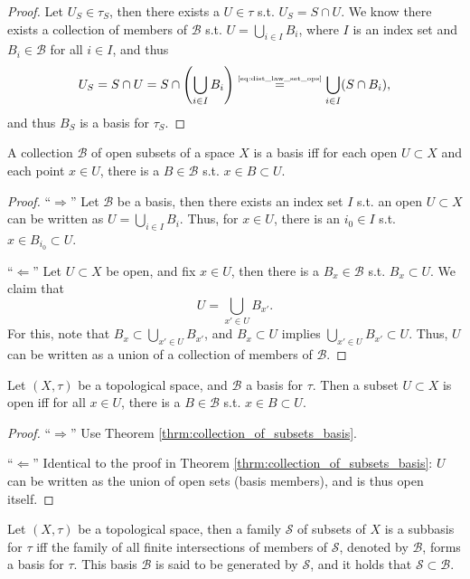 \begin{proof}
	Let $U_S \in \tau_S$, then there exists a $U\in \tau$ s.t. $U_S = S\cap U$. We know there exists a collection of members of $\mathscr B$ s.t. $U = \bigcup_{i\in I}B_i$, where $I$ is an index set and $B_i\in\mathscr B$ for all $i\in I$, and thus 
	$$U_S = S\cap U = S\cap \left(\bigcup_{i\in I}B_i\right) \overset{\tiny\eqref{eq:dist_law_set_ops}}{=} \bigcup_{i\in I}(S\cap B_i),$$
	and thus $B_S$ is a basis for $\tau_S$.
\end{proof}

\begin{theorem}\label{thrm:collection_of_subsets_basis}
	A collection $\mathscr B$ of open subsets of a space $X$ is a basis iff for each open $U\subset X$ and each point $x\in U$, there is a $B\in\mathscr B$ s.t. $x\in B\subset U$.
\end{theorem}

\begin{proof}
	\enquote{$\Longrightarrow$} Let $\mathscr B$ be a basis, then there exists an index set $I$ s.t. an open $U\subset X$ can be written as $U = \bigcup_{i\in I}B_i$. Thus, for $x\in U$, there is an $i_0\in I$ s.t. $x\in B_{i_0}\subset U$.
	
	\enquote{$\Longleftarrow$} Let $U\subset X$ be open, and fix $x\in U$, then there is a $B_x\in \mathscr B$ s.t. $B_x\subset U$. We claim that $$U = \bigcup_{x'\in U}B_{x'}.$$ For this, note that $B_x\subset \bigcup_{x'\in U}B_{x'}$, and $B_x\subset U$ implies $\bigcup_{x'\in U}B_{x'}\subset U$. Thus, $U$ can be written as a union of a collection of members of $\mathscr B$.
\end{proof}

\begin{corollary}\label{corollary:open_set_basis_member_containment}
	Let $(X, \tau)$ be a topological space, and $\mathscr B$ a basis for $\tau$. Then a subset $U\subset X$ is open iff for all $x\in U$, there is a $B\in\mathscr B$ s.t. $x\in B\subset U$.
\end{corollary}

\begin{proof}
	\enquote{$\Longrightarrow$} Use Theorem \ref{thrm:collection_of_subsets_basis}.
	
	\enquote{$\Longleftarrow$} Identical to the proof in Theorem \ref{thrm:collection_of_subsets_basis}: $U$ can be written as the union of open sets (basis members), and is thus open itself.
\end{proof}

\begin{remark}
	Let $(X, \tau)$ be a topological space, then a family $\mathscr S$ of subsets of $X$ is a subbasis for $\tau$ iff the family of all finite intersections of members of $\mathscr S$, denoted by $\mathscr B$, forms a basis for $\tau$. This basis $\mathscr B$ is said to be generated by $\mathscr S$, and it holds that $\mathscr S \subset \mathscr B$.
\end{remark}

